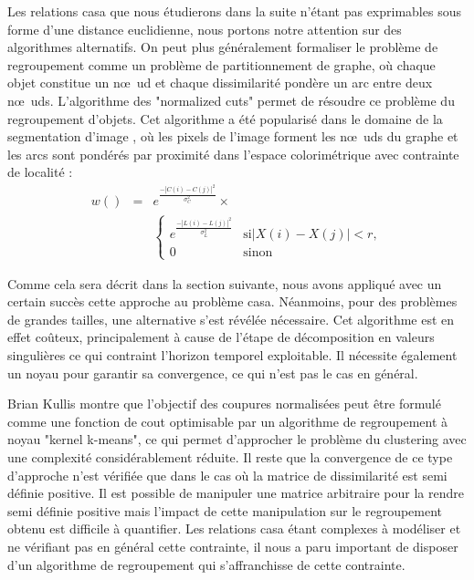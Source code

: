   Les relations casa que nous étudierons dans la suite n'étant pas exprimables sous forme d'une distance euclidienne, nous portons notre attention sur des algorithmes alternatifs. On peut plus généralement formaliser le problème de regroupement comme un problème de partitionnement de graphe, où chaque objet constitue un n\oe~ud et chaque dissimilarité pondère un arc entre deux n\oe~uds. L'algorithme des "normalized cuts" permet de résoudre ce problème du regroupement d'objets. Cet algorithme a été popularisé dans le domaine de la segmentation d'image \cite{shi2000normalized}, où les pixels de l'image forment les n\oe~uds du graphe et les arcs sont pondérés par proximité dans l'espace colorimétrique avec contrainte de localité :
  \begin{eqnarray}
  w() &=& e^{\frac{-|C(i)-C(j)|^2}{\sigma^2_C}} \times \\
  &&  \begin{cases}
  e^{\frac{-|L(i)-L(j)|^2}{\sigma^2_L}} & \text{si} |X(i)-X(j)| < r, \\
  0 & \text{sinon}
  \end{cases}
  \label{eq:shi}
  \end{eqnarray}

  Comme cela sera décrit dans la section suivante, nous avons appliqué avec un certain succès cette approche au problème casa. Néanmoins, pour des problèmes de grandes tailles, une alternative s'est révélée nécessaire. Cet algorithme est en effet coûteux, principalement à cause de l'étape de décomposition en valeurs singulières ce qui contraint l'horizon temporel exploitable. Il nécessite également un noyau pour garantir sa convergence, ce qui n'est pas le cas en général.

  Brian Kullis montre que l'objectif des coupures normalisées peut être formulé comme une fonction de cout optimisable par un algorithme de regroupement à noyau "kernel k-means", ce qui permet d'approcher le problème du clustering avec une complexité considérablement réduite. Il reste que la convergence de ce type d'approche n'est vérifiée que dans le cas où la matrice de dissimilarité est semi définie positive. Il est possible de manipuler une matrice arbitraire pour la rendre semi définie positive \cite{optimal2003} mais l'impact de cette manipulation sur le regroupement obtenu est difficile à quantifier. Les relations casa étant complexes à modéliser et ne vérifiant pas en général cette contrainte, il nous a paru important de disposer d'un algorithme de regroupement qui s'affranchisse de cette contrainte.

